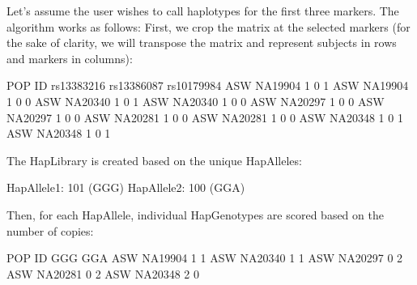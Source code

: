 \documentclass[
]{article}
\newenvironment{Shaded}{}{}
\newcommand{\DecValTok}[1]{#1}
\newcommand{\NormalTok}[1]{#1}
\begin{document}
Let's assume the user wishes to call haplotypes for the first three
markers. The algorithm works as follows: First, we crop the matrix at
the selected markers (for the sake of clarity, we will transpose the
matrix and represent subjects in rows and markers in columns):

\begin{Shaded}
\begin{Highlighting}[]
\NormalTok{POP ID      rs13383216 rs13386087 rs10179984}
\NormalTok{ASW NA19904 }\DecValTok{1}          \DecValTok{0}          \DecValTok{1}
\NormalTok{ASW NA19904 }\DecValTok{1}          \DecValTok{0}          \DecValTok{0}
\NormalTok{ASW NA20340 }\DecValTok{1}          \DecValTok{0}          \DecValTok{1}
\NormalTok{ASW NA20340 }\DecValTok{1}          \DecValTok{0}          \DecValTok{0}
\NormalTok{ASW NA20297 }\DecValTok{1}          \DecValTok{0}          \DecValTok{0}
\NormalTok{ASW NA20297 }\DecValTok{1}          \DecValTok{0}          \DecValTok{0}
\NormalTok{ASW NA20281 }\DecValTok{1}          \DecValTok{0}          \DecValTok{0}
\NormalTok{ASW NA20281 }\DecValTok{1}          \DecValTok{0}          \DecValTok{0}
\NormalTok{ASW NA20348 }\DecValTok{1}          \DecValTok{0}          \DecValTok{1}
\NormalTok{ASW NA20348 }\DecValTok{1}          \DecValTok{0}          \DecValTok{1}
\end{Highlighting}
\end{Shaded}

The HapLibrary is created based on the unique HapAlleles:

\begin{Shaded}
\begin{Highlighting}[]
\NormalTok{HapAllele1: }\DecValTok{101}\NormalTok{ (GGG)}
\NormalTok{HapAllele2: }\DecValTok{100}\NormalTok{ (GGA)}
\end{Highlighting}
\end{Shaded}

Then, for each HapAllele, individual HapGenotypes are scored based on
the number of copies:

\begin{Shaded}
\begin{Highlighting}[]
\NormalTok{POP ID      GGG        GGA}
\NormalTok{ASW NA19904 }\DecValTok{1}          \DecValTok{1}
\NormalTok{ASW NA20340 }\DecValTok{1}          \DecValTok{1}
\NormalTok{ASW NA20297 }\DecValTok{0}          \DecValTok{2}
\NormalTok{ASW NA20281 }\DecValTok{0}          \DecValTok{2}
\NormalTok{ASW NA20348 }\DecValTok{2}          \DecValTok{0}
\end{Highlighting}
\end{Shaded}
\end{document}
